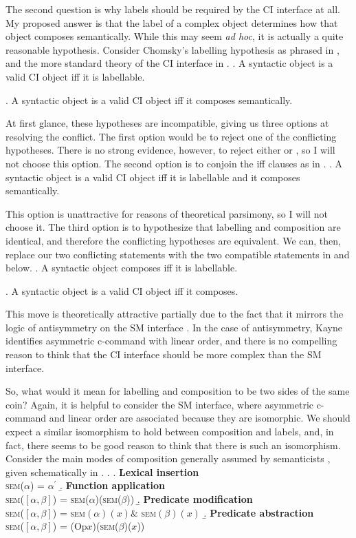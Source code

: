 \documentclass[MilwayThesis]{subfiles}
\begin{document}
The second question is why labels should be required by the CI interface at all.
My proposed answer is that the label of a complex object determines how that object composes semantically.
While this may seem \textit{ad hoc}, it is actually a quite reasonable hypothesis.
Consider Chomsky's labelling hypothesis as phrased in \Next, and the more standard theory of the CI interface in \NNext.
\ex. A syntactic object is a valid CI object iff it is labellable.

\ex. A syntactic object is a valid CI object iff it composes semantically.

At first glance, these hypotheses are incompatible, giving us three options at resolving the conflict.
The first option would be to reject one of the conflicting hypotheses.
There is no strong evidence, however, to reject either \LLast or \Last, so I will not choose this option.
The second option is to conjoin the iff clauses as in \Next.
\ex. A syntactic object is a valid CI object iff it is labellable and it composes semantically.

This option is unattractive for reasons of theoretical parsimony, so I will not choose it.
The third option is to hypothesize that labelling and composition are identical, and therefore the conflicting hypotheses are equivalent.
We can, then, replace our two conflicting statements with the two compatible statements in \Next and \NNext below.
\ex. A syntactic object composes iff it is labellable.

\ex. A syntactic object is a valid CI object iff it composes.

This move is theoretically attractive partially due to the fact that it mirrors the logic of antisymmetry on the SM interface \parencite{kayne1994antisymmetry}.
In the case of antisymmetry, Kayne identifies asymmetric c-command with linear order, and there is no compelling reason to think that the CI interface should be more complex than the SM interface.

So, what would it mean for labelling and composition to be two sides of the same coin?
Again, it is helpful to consider the SM interface, where asymmetric c-command and linear order are associated because they are isomorphic.
We should expect a similar isomorphism to hold between composition and labels, and, in fact, there seems to be good reason to think that there is such an isomorphism.
Consider the main modes of composition generally assumed by semanticists \parencite[\textit{e.g.}, by][]{heimkratzer1998semantics}, given schematically in \Next.
\ex. 
\a. \textbf{Lexical insertion}\\
\textsc{sem}($\alpha$) = $\alpha^\prime$
\b. \textbf{Function application}\\
\textsc{sem}($\left[ \alpha, \beta \right]$) = \textsc{sem}($\alpha$)(\textsc{sem}($\beta$))
\b. \textbf{Predicate modification}\\
\textsc{sem}($\left[ \alpha, \beta \right]$) = \textsc{sem}$(\alpha)(x) \&$ \textsc{sem}$(\beta)(x)$
\b. \textbf{Predicate abstraction}\\
\textsc{sem}($\left[ \alpha, \beta \right]$) = (Op$x$)(\textsc{sem}($\beta$)($x$))
\end{document}
